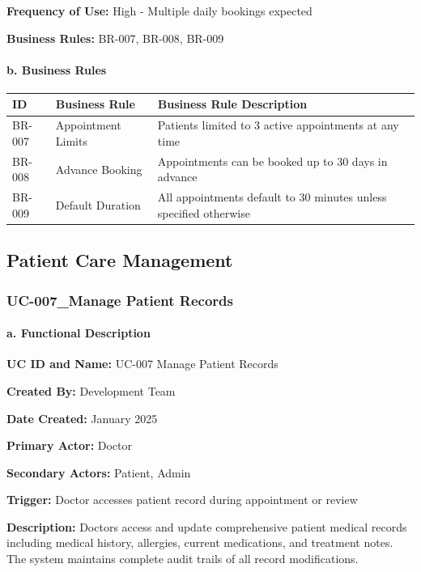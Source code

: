 \documentclass[12pt,a4paper]{article}
\begin{document}
\textbf{Frequency of Use:} High - Multiple daily bookings expected

\textbf{Business Rules:} BR-007, BR-008, BR-009

\paragraph{b. Business Rules}

\begin{longtable}{|p{2cm}|p{4cm}|p{8cm}|}
\hline
\textbf{ID} & \textbf{Business Rule} & \textbf{Business Rule Description} \\
\hline
BR-007 & Appointment Limits & Patients limited to 3 active appointments at any time \\
\hline
BR-008 & Advance Booking & Appointments can be booked up to 30 days in advance \\
\hline
BR-009 & Default Duration & All appointments default to 30 minutes unless specified otherwise \\
\hline
\end{longtable}

\subsection{Patient Care Management}

\subsubsection{UC-007\_Manage Patient Records}

\paragraph{a. Functional Description}

\textbf{UC ID and Name:} UC-007 Manage Patient Records

\textbf{Created By:} Development Team

\textbf{Date Created:} January 2025

\textbf{Primary Actor:} Doctor

\textbf{Secondary Actors:} Patient, Admin

\textbf{Trigger:} Doctor accesses patient record during appointment or review

\textbf{Description:} Doctors access and update comprehensive patient medical records including medical history, allergies, current medications, and treatment notes. The system maintains complete audit trails of all record modifications.
\end{document}

